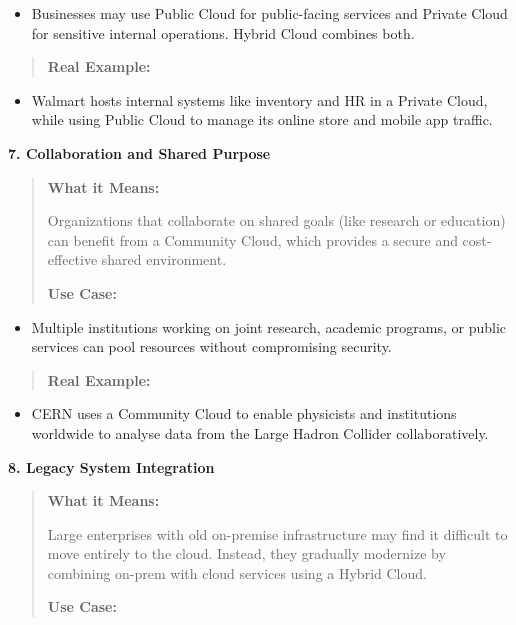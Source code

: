 \documentclass[12pt]{article}
\begin{document}
\begin{itemize}
\item
  Businesses may use Public Cloud for public-facing services and Private
  Cloud for sensitive internal operations. Hybrid Cloud combines both.
\end{itemize}

\begin{quote}
\textbf{Real Example:}
\end{quote}

\begin{itemize}
\item
  Walmart hosts internal systems like inventory and HR in a Private
  Cloud, while using Public Cloud to manage its online store and mobile
  app traffic.
\end{itemize}

\textbf{7. Collaboration and Shared Purpose}

\begin{quote}
\textbf{What it Means:}

Organizations that collaborate on shared goals (like research or
education) can benefit from a Community Cloud, which provides a secure
and cost-effective shared environment.

\textbf{Use Case:}
\end{quote}

\begin{itemize}
\item
  Multiple institutions working on joint research, academic programs, or
  public services can pool resources without compromising security.
\end{itemize}

\begin{quote}
\textbf{Real Example:}
\end{quote}

\begin{itemize}
\item
  CERN uses a Community Cloud to enable physicists and institutions
  worldwide to analyse data from the Large Hadron Collider
  collaboratively.
\end{itemize}

\textbf{8. Legacy System Integration}

\begin{quote}
\textbf{What it Means:}

Large enterprises with old on-premise infrastructure may find it
difficult to move entirely to the cloud. Instead, they gradually
modernize by combining on-prem with cloud services using a Hybrid Cloud.

\textbf{Use Case:}
\end{quote}
\end{document}
